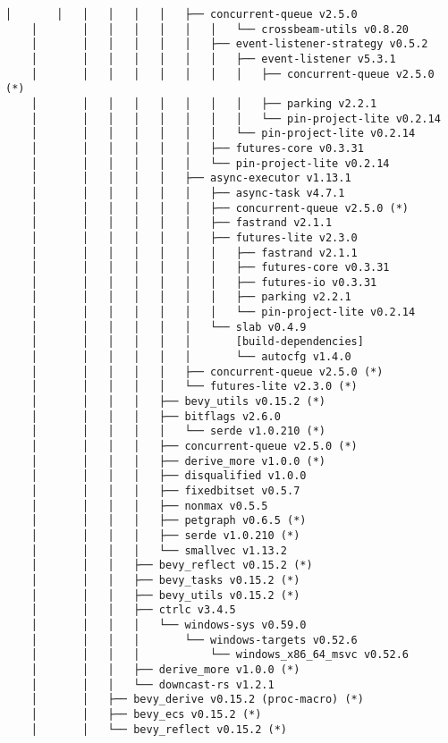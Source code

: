 \begin{lstlisting}[style=mystyle, caption={dependencias del proyecto}, label={lst:dependencias}]
    │       │   │   │   │   │   ├── concurrent-queue v2.5.0
    │       │   │   │   │   │   │   └── crossbeam-utils v0.8.20
    │       │   │   │   │   │   ├── event-listener-strategy v0.5.2
    │       │   │   │   │   │   │   ├── event-listener v5.3.1
    │       │   │   │   │   │   │   │   ├── concurrent-queue v2.5.0 (*)
    │       │   │   │   │   │   │   │   ├── parking v2.2.1
    │       │   │   │   │   │   │   │   └── pin-project-lite v0.2.14
    │       │   │   │   │   │   │   └── pin-project-lite v0.2.14
    │       │   │   │   │   │   ├── futures-core v0.3.31
    │       │   │   │   │   │   └── pin-project-lite v0.2.14
    │       │   │   │   │   ├── async-executor v1.13.1
    │       │   │   │   │   │   ├── async-task v4.7.1
    │       │   │   │   │   │   ├── concurrent-queue v2.5.0 (*)
    │       │   │   │   │   │   ├── fastrand v2.1.1
    │       │   │   │   │   │   ├── futures-lite v2.3.0
    │       │   │   │   │   │   │   ├── fastrand v2.1.1
    │       │   │   │   │   │   │   ├── futures-core v0.3.31
    │       │   │   │   │   │   │   ├── futures-io v0.3.31
    │       │   │   │   │   │   │   ├── parking v2.2.1
    │       │   │   │   │   │   │   └── pin-project-lite v0.2.14
    │       │   │   │   │   │   └── slab v0.4.9
    │       │   │   │   │   │       [build-dependencies]
    │       │   │   │   │   │       └── autocfg v1.4.0
    │       │   │   │   │   ├── concurrent-queue v2.5.0 (*)
    │       │   │   │   │   └── futures-lite v2.3.0 (*)
    │       │   │   │   ├── bevy_utils v0.15.2 (*)
    │       │   │   │   ├── bitflags v2.6.0
    │       │   │   │   │   └── serde v1.0.210 (*)
    │       │   │   │   ├── concurrent-queue v2.5.0 (*)
    │       │   │   │   ├── derive_more v1.0.0 (*)
    │       │   │   │   ├── disqualified v1.0.0
    │       │   │   │   ├── fixedbitset v0.5.7
    │       │   │   │   ├── nonmax v0.5.5
    │       │   │   │   ├── petgraph v0.6.5 (*)
    │       │   │   │   ├── serde v1.0.210 (*)
    │       │   │   │   └── smallvec v1.13.2
    │       │   │   ├── bevy_reflect v0.15.2 (*)
    │       │   │   ├── bevy_tasks v0.15.2 (*)
    │       │   │   ├── bevy_utils v0.15.2 (*)
    │       │   │   ├── ctrlc v3.4.5
    │       │   │   │   └── windows-sys v0.59.0
    │       │   │   │       └── windows-targets v0.52.6
    │       │   │   │           └── windows_x86_64_msvc v0.52.6
    │       │   │   ├── derive_more v1.0.0 (*)
    │       │   │   └── downcast-rs v1.2.1
    │       │   ├── bevy_derive v0.15.2 (proc-macro) (*)
    │       │   ├── bevy_ecs v0.15.2 (*)
    │       │   └── bevy_reflect v0.15.2 (*)

\end{lstlisting}

